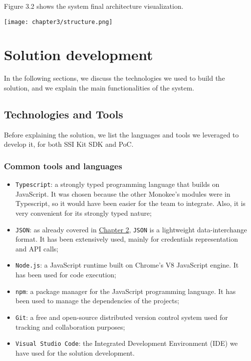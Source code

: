 Figure 3.2 shows the system final architecture visualization.
\begin{center}
    \texttt{[image: chapter3/structure.png]}
    \label{fig:structure}
\end{center}

\clearpage
\section{Solution development}
In the following sections, we discuss the technologies we used to build the
solution, and we explain the main functionalities of the system.
\subsection{Technologies and Tools}
Before explaining the solution, we list the languages and tools we leveraged to develop it,
for both SSI Kit SDK and PoC.

\subsubsection{Common tools and languages}
\begin{itemize}
    \setlength\itemsep{-0.1em}
    \item \texttt{Typescript}: a strongly typed programming language that builds 
    on JavaScript. It was chosen because the other Monokee's modules were in 
    Typescript, so it would have been easier for the team to integrate. Also, it is 
    very convenient for its strongly typed nature;
    \item \texttt{JSON}: as already covered in \hyperref[subsubsec:json]{Chapter 2}, 
    \texttt{JSON} is a lightweight data-interchange format. It has been extensively used,
    mainly for credentials representation and API calls;
    \item \texttt{Node.js}: a JavaScript runtime built on Chrome's V8 JavaScript
    engine. It has been used for code execution;
    \item \texttt{npm}: a package manager for the JavaScript programming language.
    It has been used to manage the dependencies of the projects;
    \item \texttt{Git}: a free and open-source distributed version control system
    used for tracking and collaboration purposes;
    \item \texttt{Visual Studio Code}: the Integrated Development Environment (IDE)
    we have used for the solution development.
\end{itemize}

